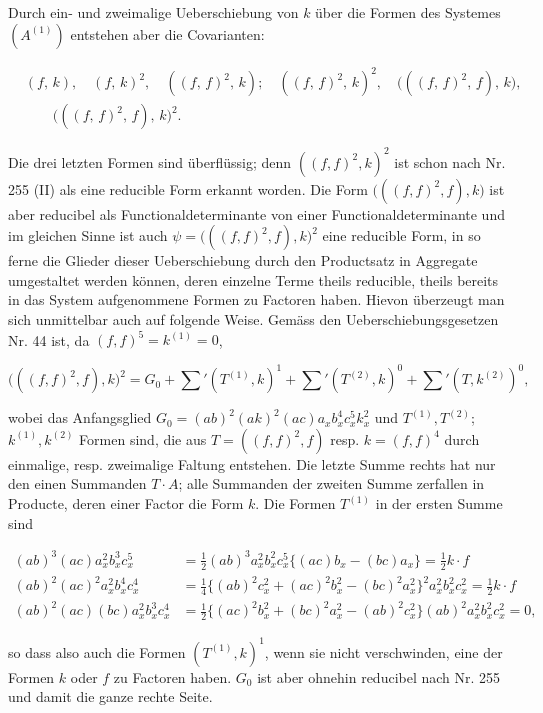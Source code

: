 \documentclass[11pt]{article}
\begin{document}
Durch ein- und zweimalige Ueberschiebung von $k$ über die
Formen des Systemes $(A^{(1)})$ entstehen aber die Covarianten:

\[
\begin{aligned}
&(f,\, k), \quad (f,\, k)^2, \quad ((f,\, f)^2,\, k); \quad ((f,\, f)^2,\, k)^2, \quad \bigl(((f,\, f)^2,\, f),\, k\bigr),\\
&\qquad \bigl(((f,\, f)^2,\, f),\, k\bigr)^2.
\end{aligned}
\]

Die drei letzten Formen sind überflüssig; denn $((f, f)^2, k)^2$ ist schon
nach Nr. 255 (II) als eine reducible Form erkannt worden. Die Form
$\bigl(((f, f)^2, f), k\bigr)$ ist aber reducibel als Functionaldeterminante von einer
Functionaldeterminante und im gleichen Sinne ist auch $\psi = \bigl(((f,f)^2, f), k\bigr)^2$
eine reducible Form, in so ferne die Glieder dieser Ueberschiebung
durch den Productsatz in Aggregate umgestaltet werden können, deren
einzelne Terme theils reducible, theils bereits in das System aufgenommene
 Formen zu Factoren haben. Hievon überzeugt man sich
unmittelbar auch auf folgende Weise. Gemäss den Ueberschiebungsgesetzen
 Nr. 44 ist, da $(f, f)^5 = k^{(1)} = 0$,

\[
\bigl(((f, f)^2, f), k\bigr)^2 = G_0 + \sum{}'(T^{(1)}, k)^1 + \sum{}'(T^{(2)}, k)^0 + \sum{}'(T, k^{(2)})^0,
\]

wobei das Anfangsglied $G_0 = (ab)^2 (ak)^2 (ac) a_x b_x^4 c_x^5 k_x^2$ und $T^{(1)}, T^{(2)}$;
$k^{(1)}, k^{(2)}$ Formen sind, die aus $T = ((f, f)^2, f)$ resp. $k = (f, f)^4$ durch
einmalige, resp. zweimalige Faltung entstehen. Die letzte Summe
rechts hat nur den einen Summanden $T \cdot A$; alle Summanden der
zweiten Summe zerfallen in Producte, deren einer Factor die Form $k$.
Die Formen $T^{(1)}$ in der ersten Summe sind

\[
\begin{aligned}
(ab)^3 (ac) a_x^2 b_x^3 c_x^5 &= \tfrac{1}{2} (ab)^3 a_x^2 b_x^2 c_x^5 \{(ac) b_x - (bc) a_x\} = \tfrac{1}{2} k \cdot f\\[4pt]
(ab)^2 (ac)^2 a_x^2 b_x^4 c_x^4 &= \tfrac{1}{4} \{(ab)^2 c_x^2 + (ac)^2 b_x^2 - (bc)^2 a_x^2\}^2 a_x^2 b_x^2 c_x^2 = \tfrac{1}{2} k \cdot f\\[4pt]
(ab)^2 (ac) (bc) a_x^2 b_x^3 c_x^4 &= \tfrac{1}{2} \{(ac)^2 b_x^2 + (bc)^2 a_x^2 - (ab)^2 c_x^2\} (ab)^2 a_x^2 b_x^2 c_x^2 = 0,
\end{aligned}
\]

so dass also auch die Formen $(T^{(1)}, k)^1$, wenn sie nicht verschwinden,
eine der Formen $k$ oder $f$ zu Factoren haben. $G_0$ ist aber ohnehin
reducibel nach Nr. 255 und damit die ganze rechte Seite.
\end{document}

